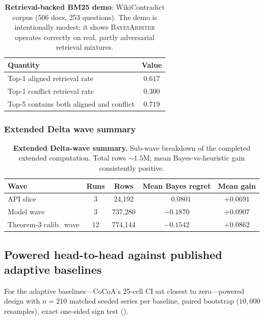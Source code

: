 \begin{table}[H]
\centering
\small
\caption{\textbf{Retrieval-backed BM25 demo}: WikiContradict corpus (506 docs,
253 questions).  The demo is intentionally modest; it shows \textsc{BayesArbiter}
operates correctly on real, partly adversarial retrieval mixtures.}
\label{tab:retrieval-demo-app}
\begin{tabular}{lc}
\toprule
\textbf{Quantity} & \textbf{Value}\\
\midrule
Top-1 aligned retrieval rate                & $0.617$\\
Top-1 conflict retrieval rate               & $0.300$\\
Top-5 contains both aligned and conflict    & $0.719$\\
\bottomrule
\end{tabular}
\end{table}

\subsubsection{Extended Delta wave summary}

\begin{table}[H]
\centering
\small
\caption{\textbf{Extended Delta-wave summary.}  Sub-wave breakdown of the
completed extended computation.  Total rows $\sim 1.5$M; mean Bayes-vs-heuristic
gain consistently positive.}
\label{tab:delta-wave}
\setlength{\tabcolsep}{4pt}
\begin{tabular}{lcccc}
\toprule
\textbf{Wave} & \textbf{Runs} & \textbf{Rows} & \textbf{Mean Bayes regret} & \textbf{Mean gain}\\
\midrule
API slice                & 3   & 24{,}192   & $\phantom{-}0.0801$ & $+0.0691$\\
Model wave               & 3   & 737{,}280  & $-0.1870$ & $+0.0907$\\
Theorem-3 calib.\ wave    & 12  & 774{,}144  & $-0.1542$ & $+0.0862$\\
\bottomrule
\end{tabular}
\end{table}

\subsection{Powered head-to-head against published adaptive baselines}
\label{app:powered-headtohead}

For the adaptive baselines---CoCoA's 25-cell CI sat closest to
zero---powered design with $n\!=\!210$ matched seeded series
per baseline, paired bootstrap ($10{,}000$ resamples), exact
one-sided sign test ().

